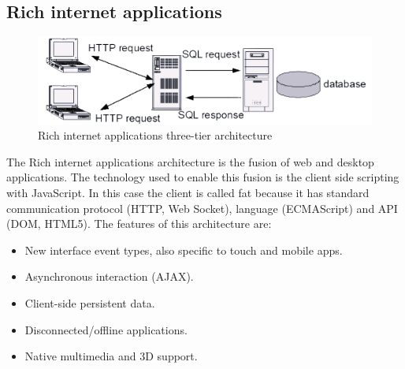 \documentclass[12pt, a4paper]{report}
\newtheorem[style=M,bodystyle=\normalfont]{theorem}{Theorem}
\newtheorem[style=M,bodystyle=\normalfont]{corollary}{Corollary}
\newtheorem[style=M,bodystyle=\normalfont]{lemma}{Lemma}
\newtheorem[style=M,bodystyle=\normalfont]{definition}{Definition}
\begin{document}
    \subsection{Rich internet applications}
    \begin{figure}[H]
        \centering
        \includegraphics[width=0.5\linewidth]{images/ttria.png}
        \caption{Rich internet applications three-tier architecture}
    \end{figure}
    The Rich internet applications architecture is the fusion of web and desktop applications. The technology used to enable this fusion is the client side scripting 
    with JavaScript. In this case the client is called fat because it has standard communication protocol (HTTP, Web Socket), language (ECMAScript) and API (DOM, HTML5). 
    The features of this architecture are: 
    \begin{itemize}
        \item New interface event types, also specific to touch and mobile apps.
        \item Asynchronous interaction (AJAX).
        \item Client-side persistent data.
        \item Disconnected/offline applications.
        \item Native multimedia and 3D support.
    \end{itemize}
\end{document}
